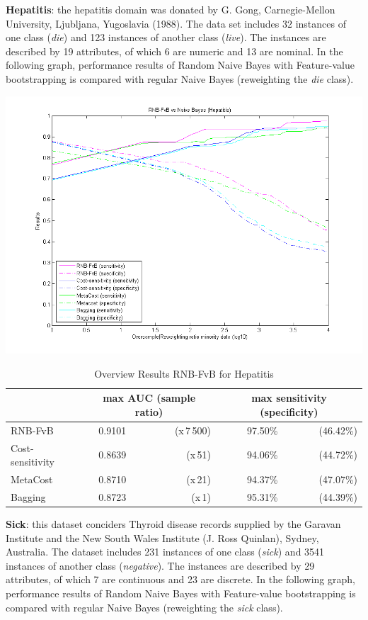 \newpage
\textbf{Hepatitis}: the hepatitis domain was donated by G. Gong, Carnegie-Mellon University, Ljubljana, Yugoslavia (1988). The data set includes 32 instances of one class (\textit{die}) and 123 instances of another class (\textit{live}). The instances are described by 19 attributes, of which 6 are numeric and 13 are nominal. In the following graph, performance results of Random Naive Bayes with Feature-value bootstrapping is compared with regular Naive Bayes (reweighting the \textit{die} class).
 
\includegraphics[scale=0.65]{img/RNB-FvB-hepatitis.png}

\begin{table}[h]
\centering  
\begin{tabular}{ l | c r | r r|}                                      
& \multicolumn{2}{c}{max AUC (sample ratio)} & \multicolumn{2}{c}{max sensitivity (specificity)} \\
\hline 
RNB-FvB & 0.9101 & (x\,7\,500) & 97.50\% & (46.42\%)\\
Cost-sensitivity & 0.8639 & (x\,51) & 94.06\% & (44.72\%)\\
MetaCost & 0.8710 & (x\,21) & 94.37\% & (47.07\%)\\
Bagging & 0.8723 & (x\,1) & 95.31\% & (44.39\%)\\
\hline                          %
\end{tabular}
\label{tab:PPer}
\caption{Overview Results RNB-FvB for Hepatitis} %
\end{table}

\newpage
\textbf{Sick}: this dataset conciders Thyroid disease records supplied by the Garavan Institute and the New South Wales Institute (J. Ross Quinlan), Sydney, Australia. The dataset includes 231 instances of one class (\textit{sick}) and 3541 instances of another class (\textit{negative}). The instances are described by 29 attributes, of which  7 are continuous and 23 are discrete. In the following graph, performance results of Random Naive Bayes with Feature-value bootstrapping is compared with regular Naive Bayes (reweighting the \textit{sick} class).


